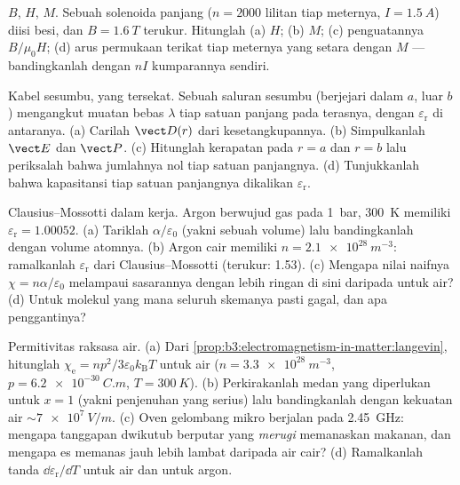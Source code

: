 \begin{exercise}[$\star$]\label{exo:b3:electromagnetism-in-matter:4}
$B$, $H$, $M$. Sebuah solenoida panjang ($n = \num{2000}$ lilitan tiap meternya,
$I = \qty{1.5}{A}$) diisi besi, dan $B = \qty{1.6}{T}$
terukur. Hitunglah (a) $H$; (b) $M$; (c) penguatannya
$B/\mu_0H$; (d) arus permukaan terikat tiap meternya yang setara dengan
$M$ --- bandingkanlah dengan $nI$ kumparannya sendiri.
\end{exercise}

\begin{exercise}[$\star\star$]\label{exo:b3:electromagnetism-in-matter:5}
Kabel sesumbu, yang tersekat. Sebuah saluran sesumbu (berjejari dalam $a$, luar
$b$) mengangkut muatan bebas $\lambda$ tiap satuan panjang pada terasnya,
dengan  $\varepsilon_{\text{r}}$ di antaranya. (a) Carilah
$\vect D(r)$ dari kesetangkupannya. (b) Simpulkanlah $\vect E$ dan $\vect P$.
(c) Hitunglah kerapatan  pada $r = a$ dan $r = b$ lalu
periksalah bahwa jumlahnya nol tiap satuan panjangnya. (d) Tunjukkanlah
bahwa kapasitansi tiap satuan panjangnya dikalikan $\varepsilon_{\text{r}}$.
\end{exercise}

\begin{exercise}[$\star\star$]\label{exo:b3:electromagnetism-in-matter:6}
Clausius--Mossotti dalam kerja. Argon berwujud gas pada \qty{1}{bar},
\qty{300}{K} memiliki $\varepsilon_{\text{r}} = 1.00052$. (a) Tariklah
$\alpha/\varepsilon_0$ (yakni sebuah volume) lalu bandingkanlah dengan
volume atomnya. (b) Argon cair memiliki $n = \qty{2.1e28}{m^{-3}}$:
ramalkanlah $\varepsilon_{\text{r}}$ dari Clausius--Mossotti (terukur: 1.53).
(c) Mengapa nilai naifnya $\chi = n\alpha/\varepsilon_0$ melampaui
sasarannya dengan lebih ringan di sini daripada untuk air? (d) Untuk
molekul yang mana seluruh skemanya pasti gagal, dan apa penggantinya?
\end{exercise}

\begin{exercise}[$\star\star$]\label{exo:b3:electromagnetism-in-matter:7}
Permitivitas raksasa air. (a) Dari
\cref{prop:b3:electromagnetism-in-matter:langevin}, hitunglah
$\chi_{\text{e}} = np^2/3\varepsilon_0k_{\text{B}}T$ untuk air
($n = \qty{3.3e28}{m^{-3}}$, $p = \qty{6.2e-30}{C.m}$,
$T = \qty{300}{K}$). (b) Perkirakanlah medan yang diperlukan untuk $x = 1$
(yakni penjenuhan yang serius) lalu bandingkanlah dengan kekuatan
 air $\sim\qty{7e7}{V/m}$. (c) Oven gelombang mikro berjalan pada \qty{2.45}{GHz}:
mengapa tanggapan dwikutub berputar yang \emph{merugi} memanaskan makanan, dan
mengapa es memanas jauh lebih lambat daripada air cair? (d) Ramalkanlah
tanda $\dd\varepsilon_{\text{r}}/\dd T$ untuk air dan untuk
argon.
\end{exercise}


